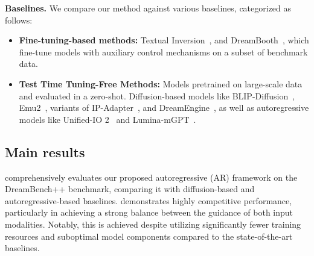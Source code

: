 \textbf{Baselines.}
We compare our method against various baselines, categorized as follows:
\begin{itemize}[left=2pt, itemsep=0.5pt,topsep=0.5pt]
    \item \textbf{Fine-tuning-based methods:} Textual Inversion~\citep{gal2022imageworthwordpersonalizing}, and DreamBooth~\citep{peng2025dreambenchpp}, which fine-tune models with auxiliary control mechanisms on a subset of benchmark data.
    \item \textbf{Test Time Tuning-Free Methods:} Models pretrained on large-scale data and evaluated in a zero-shot. Diffusion-based models like BLIP-Diffusion~\citep{li2023blipdiffusionpretrainedsubjectrepresentation}, Emu2~\citep{emu2}, variants of IP-Adapter~\citep{ye2023ip-adapter}, and DreamEngine~\citep{dreamengine}, as well as autoregressive models like Unified-IO 2~\citep{lu2023unifiedio2} and Lumina-mGPT~\citep{2024lumina}. 
\end{itemize}






\subsection{Main results}
\label{sec:main}
 comprehensively evaluates our proposed autoregressive (AR) framework on the DreamBench++ benchmark, comparing it with diffusion-based and autoregressive-based baselines.
\model demonstrates highly competitive performance, particularly in achieving a strong balance between the guidance of both input modalities. Notably, this is achieved despite utilizing significantly fewer training resources and suboptimal model components compared to the state-of-the-art baselines.

